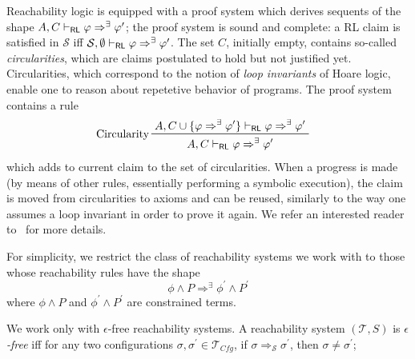 Reachability logic is equipped with a proof system which derives sequents of the shape
$A, C \vdash_{\mathsf{RL}} \varphi \Rightarrow^\exists \varphi^\prime$;
the proof system is sound and complete: a RL claim is satisfied in $\mathcal{S}$
iff $\mathcal{S}, \emptyset \vdash_{\mathsf{RL}} \varphi \Rightarrow^\exists \varphi^\prime$.
The set $C$, initially empty, contains so-called \emph{circularities},
which are claims postulated to hold but not justified yet.
Circularities, which correspond to the notion of \emph{loop invariants} of Hoare logic,
enable one to reason about repetetive behavior of programs.
The proof system contains a rule
\begin{align*}
    & \prftree[l]{Circularity}
      { A, C \cup \{ \varphi\Rightarrow^\exists \varphi^\prime \} \vdash_\RL \varphi \Rightarrow^\exists \varphi^\prime }
      { A, C \vdash_\RL \varphi \Rightarrow^\exists \varphi^\prime }
\end{align*}
which adds to current claim to the set of circularities.
When a progress is made (by means of other rules, essentially performing a symbolic execution),
the claim is moved from circularities to axioms and can be reused, similarly to the way one assumes a loop invariant
in order to prove it again.
We refer an interested reader to~\cite{RosuS12oopsla} for more details.




\begin{remark}\label{rem:shapeOfReachabilityRules}
For simplicity, we restrict the class of reachability systems we work with to those whose reachability rules
have the shape
\begin{equation*}
    \phi \land P \Rightarrow^\exists \phi^\prime \land P^\prime
\end{equation*}
where $\phi \land P$ and $\phi^\prime \land P^\prime$ are constrained terms.
\end{remark}

\begin{remark}\label{rem:noEmptySteps}
We work only with $\epsilon$-free reachability systems.
A reachability system $(\mathcal{T}, S)$ is \emph{$\epsilon$-free}
iff for any two configurations $\sigma, \sigma^\prime \in \mathcal{T}_{\mathit{Cfg}}$, if
$\sigma \Rightarrow_{\mathcal{S}} \sigma^\prime$, then $\sigma \not = \sigma^\prime$;
\end{remark}